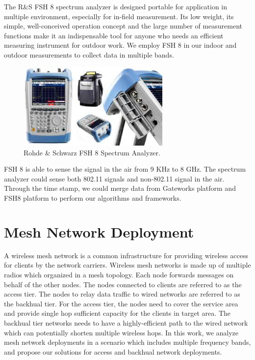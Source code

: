 The R\&S FSH 8 spectrum analyzer is designed portable for application in multiple environment, 
especially for in-field measurement. Its low weight, its simple, well-conceived operation 
concept and the large number of measurement functions make it an indispensable tool for anyone 
who needs an efficient measuring instrument for outdoor work. We employ FSH $8$ in our indoor 
and outdoor measurements to collect data in multiple bands.

\begin{figure} 
\centering
\includegraphics[width=75mm]{figures/fsh8}
\vspace{-0.1in}
\caption{Rohde \& Schwarz FSH 8 Spectrum Analyzer.}
\label{fig:fsh8}
\vspace{0.1in}
\end{figure}

FSH 8 is able to sense the signal in the air from 9 KHz to 8 GHz. The spectrum analyzer could 
sense both 802.11 signals and non-802.11 signal in the air. Through the time stamp, we could 
merge data from Gateworks platform and FSH8 platform to perform our algorithms and frameworks.

\section{Mesh Network Deployment}

A wireless mesh network is a common infrastructure for providing wireless access for clients 
by the network carriers. Wireless mesh networks is made up of multiple radios which organized 
in a mesh topology. Each node forwards messages on behalf of the other nodes. The nodes 
connected to clients are referred to as the access tier. The nodes to relay data traffic to 
wired networks are referred to as the backhual tier. For the  access tier, the nodes need to 
cover the service area and provide single hop sufficient capacity for the clients in target 
area. The backhual tier networks needs to have a highly-efficient path to the wired network 
which can potentially shorten multiple wireless hops. In this work, we analyze mesh network 
deployments in a scenario which includes multiple frequency bands, and propose our solutions 
for access and backhual network deployments.

